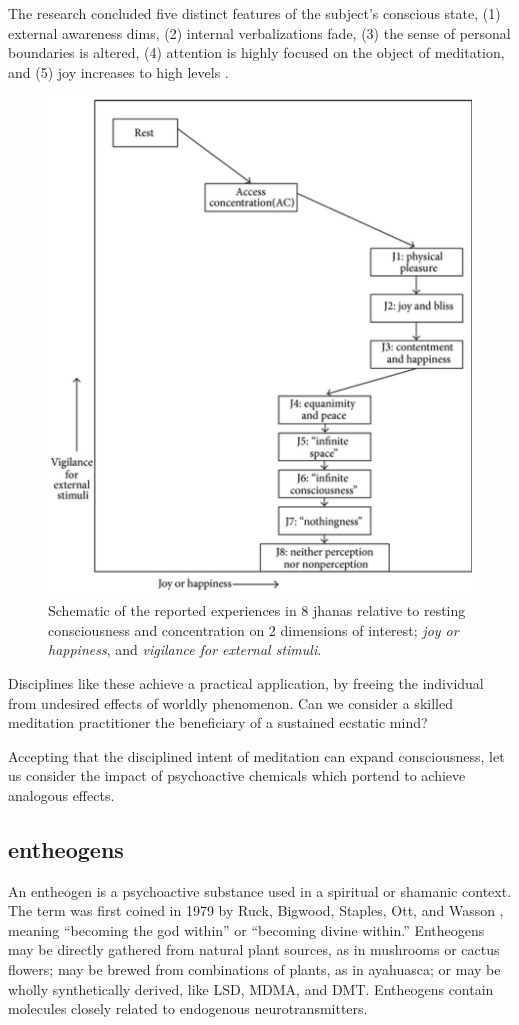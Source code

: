 \documentclass{UIdahoMastersThesis}
\begin{document}
The research concluded five distinct features of the subject's conscious state, (1) external awareness dims, (2) internal verbalizations fade, (3) the sense of personal boundaries is altered, (4) attention is highly focused on the object of meditation, and (5) joy increases to high levels \cite{michael_r._hagerty_case_2013}.

\begin{figure}[h!]
	\centering
	\includegraphics[width=0.63\linewidth]{graph_joy.png}
	\caption{Schematic of the reported experiences in 8 jhanas relative to resting consciousness and concentration on 2 dimensions of interest; \emph{joy or happiness}, and \emph{vigilance for external stimuli}.}
	\label{fig:graphjoy}
\end{figure}



Disciplines like these achieve a practical application, by freeing the individual from undesired effects of worldly phenomenon. Can we consider a skilled meditation practitioner the beneficiary of a sustained ecstatic mind?

Accepting that the disciplined intent of meditation can expand consciousness, let us consider the impact of psychoactive chemicals which portend to achieve analogous effects. 


\subsection{entheogens}

An entheogen is a psychoactive substance used in a spiritual or shamanic context. The term was first coined in 1979 by Ruck, Bigwood, Staples, Ott, and Wasson \cite{ruck_entheogens._1979}, meaning ``becoming the god within'' or ``becoming divine within.''  Entheogens may be directly gathered from natural plant sources, as in mushrooms or cactus flowers; may be brewed from combinations of plants, as in ayahuasca; or may be wholly synthetically derived, like LSD, MDMA, and DMT. Entheogens contain molecules closely related to endogenous neurotransmitters. 
\end{document}
